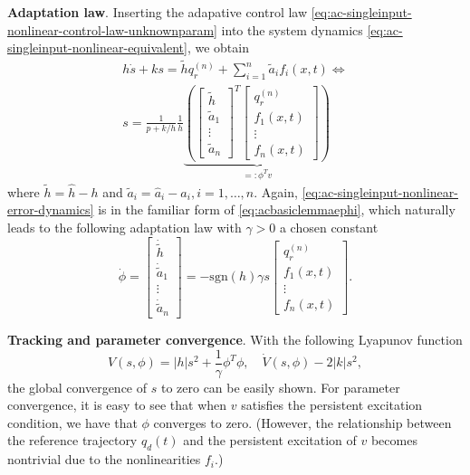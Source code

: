 \documentclass[
]{book}
\theoremstyle{definition}
\theoremstyle{definition}
\theoremstyle{definition}
\theoremstyle{definition}
\theoremstyle{remark}
\begin{document}
\textbf{Adaptation law}. Inserting the adapative control law \eqref{eq:ac-singleinput-nonlinear-control-law-unknownparam} into the system dynamics \eqref{eq:ac-singleinput-nonlinear-equivalent}, we obtain
\begin{align}
h \dot{s} + ks = \tilde{h} q_r^{(n)} + \sum_{i=1}^n \tilde{a}_i f_i (x,t) \Longleftrightarrow \\
s = \frac{1}{p + k/h} \frac{1}{h} \underbrace{ \left( 
    \begin{bmatrix} \tilde{h} \\ \tilde{a}_1 \\ \vdots \\ \tilde{a}_n \end{bmatrix}^T
    \begin{bmatrix} q_r^{(n)} \\ f_1(x,t) \\ \vdots \\ f_n(x,t) \end{bmatrix}
    \right)}_{=:\phi^T v}
\label{eq:ac-singleinput-nonlinear-error-dynamics}
\end{align}
where \(\tilde{h} = \hat{h} - h\) and \(\tilde{a}_i = \hat{a}_i - a_i,i=1,\dots,n\). Again, \eqref{eq:ac-singleinput-nonlinear-error-dynamics} is in the familiar form of \eqref{eq:acbasiclemmaephi}, which naturally leads to the following adaptation law with \(\gamma > 0\) a chosen constant
\begin{equation}
\dot{\phi} = \begin{bmatrix} \dot{\tilde{h}} \\ \dot{\tilde{a}}_1 \\ \vdots \\ \dot{\tilde{a}}_n \end{bmatrix} = - \mathrm{sgn}(h) \gamma s \begin{bmatrix} q_r^{(n)} \\ f_1(x,t) \\ \vdots \\ f_n(x,t) \end{bmatrix}.
\label{eq:ac-singleinput-nonlinear-adaptation-law}
\end{equation}

\textbf{Tracking and parameter convergence}. With the following Lyapunov function
\begin{equation}
V(s,\phi) = |h| s^2 + \frac{1}{\gamma} \phi^T \phi, \quad \dot{V}(s,\phi) -2|k| s^2,
\label{eq:ac-singleinput-nonlinear-lyapunov}
\end{equation}
the global convergence of \(s\) to zero can be easily shown. For parameter convergence, it is easy to see that when \(v\) satisfies the persistent excitation condition, we have that \(\phi\) converges to zero. (However, the relationship between the reference trajectory \(q_d(t)\) and the persistent excitation of \(v\) becomes nontrivial due to the nonlinearities \(f_i\).)
\end{document}
